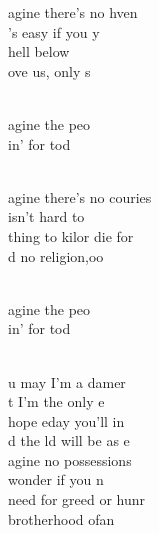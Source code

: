 \documentclass[12pt]{article}
\begin{document}
\begin{multicols*}{2}
\begin{cancion}%
	agine there's no hven\\
	's easy if you y\\
	 hell below \\
	ove us, only s\\\jump\\
	\begin{chorus}%
	agine  the peo\\
	in' for tod\\
	\end{chorus}%
	\jump\\
	agine there's no couries\\
	 isn't hard to \\
	thing to kilor die for\\
	d no religion,oo\\\jump\\
	\begin{chorus}%
	agine  the peo\\
	in' for tod\\
	\end{chorus}%
	\jump\\
	u may  I'm a damer \\
	t I'm  the only e  \\
	hope eday you'll in \\
	d the ld will be as e\\
\jump
	agine no possessions\\
	wonder if you n\\
	 need for greed or hunr\\
	brotherhood ofan\\\jump\\

\end{cancion}
\end{multicols*}
\end{document}
